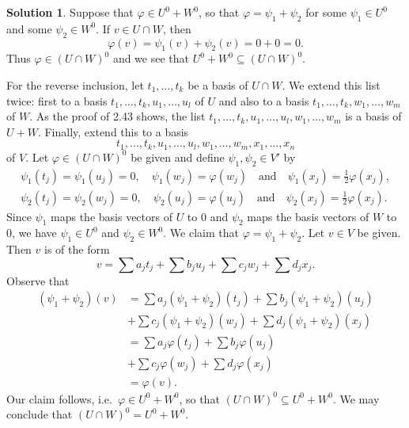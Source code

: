 \documentclass[12pt]{article}
\theoremstyle{definition}
\theoremstyle{exercise}
\theoremstyle{solution}
\newtheorem*{solution}{Solution}
\newcommand{\quand}{\quad \text{and} \quad}
\begin{document}
\begin{solution}
    Suppose that \( \varphi \in U^0 + W^0 \), so that \( \varphi = \psi_1 + \psi_2 \) for some \( \psi_1 \in U^0 \) and some \( \psi_2 \in W^0 \). If \( v \in U \cap W \), then
    \[
        \varphi(v) = \psi_1(v) + \psi_2(v) = 0 + 0 = 0.
    \]
    Thus \( \varphi \in (U \cap W)^0 \) and we see that \( U^0 + W^0 \subseteq (U \cap W)^0 \).

    For the reverse inclusion, let \( t_1, \ldots, t_k \) be a basis of \( U \cap W \). We extend this list twice: first to a basis \( t_1, \ldots, t_k, u_1, \ldots, u_l \) of \( U \) and also to a basis \( t_1, \ldots, t_k, w_1, \ldots, w_m \) of \( W \). As the proof of 2.43 shows, the list \( t_1, \ldots, t_k, u_1, \ldots, u_l, w_1, \ldots, w_m \) is a basis of \( U + W \). Finally, extend this to a basis
    \[
        t_1, \ldots, t_k, u_1, \ldots, u_l, w_1, \ldots, w_m, x_1, \ldots, x_n
    \]
    of \( V \). Let \( \varphi \in (U \cap W)^0 \) be given and define \( \psi_1, \psi_2 \in V' \) by
    \begin{gather*}
        \psi_1(t_j) = \psi_1(u_j) = 0, \quad \psi_1(w_j) = \varphi(w_j) \quand \psi_1(x_j) = \tfrac{1}{2} \varphi(x_j), \\
        \psi_2(t_j) = \psi_2(w_j) = 0, \quad \psi_2(u_j) = \varphi(u_j) \quand \psi_2(x_j) = \tfrac{1}{2} \varphi(x_j).
    \end{gather*}
    Since \( \psi_1 \) maps the basis vectors of \( U \) to 0 and \( \psi_2 \) maps the basis vectors of \( W \) to 0, we have \( \psi_1 \in U^0 \) and \( \psi_2 \in W^0 \). We claim that \( \varphi = \psi_1 + \psi_2 \). Let \( v \in V \) be given. Then \( v \) is of the form
    \[
        v = \sum a_j t_j + \sum b_j u_j + \sum c_j w_j + \sum d_j x_j.
    \]
    Observe that
    \begin{align*}
        (\psi_1 + \psi_2)(v) &= \sum a_j (\psi_1 + \psi_2)(t_j) + \sum b_j (\psi_1 + \psi_2)(u_j) \\
        &+ \sum c_j (\psi_1 + \psi_2)(w_j) + \sum d_j (\psi_1 + \psi_2)(x_j) \\
        &= \sum a_j \varphi(t_j) + \sum b_j \varphi(u_j) \\
        &+ \sum c_j \varphi(w_j) + \sum d_j \varphi(x_j) \\
        &= \varphi(v).
    \end{align*}
    Our claim follows, i.e.\ \( \varphi \in U^0 + W^0 \), so that \( (U \cap W)^0 \subseteq U^0 + W^0 \). We may conclude that \( (U \cap W)^0 = U^0 + W^0 \).
\end{solution}
\end{document}
